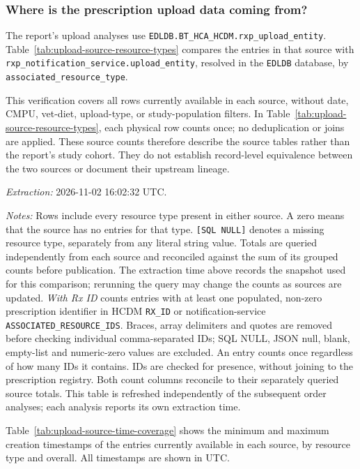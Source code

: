 \subsubsection{Where is the prescription upload data coming from?}
\label{subsec:upload-data-sources}
The report's upload analyses use
\texttt{EDLDB.BT\_HCA\_HCDM.rxp\_upload\_entity}.
Table~\ref{tab:upload-source-resource-types} compares the entries in that
source with \texttt{rxp\_notification\_service.upload\_entity}, resolved in
the \texttt{EDLDB} database, by \texttt{associated\_resource\_type}.

This verification covers all rows currently available in each source,
without date, CMPU, vet-diet, upload-type, or study-population filters.
In Table~\ref{tab:upload-source-resource-types}, each physical row counts
once; no deduplication or joins are applied.
These source counts therefore describe the source tables rather than the report's
study cohort. They do not establish record-level equivalence between the
two sources or document their upstream lineage.



\noindent\textit{Extraction:} 2026-11-02 16:02:32 UTC.


\noindent\textit{Notes:} Rows include every resource type present in either
source. A zero means that the source has no entries for that type.
\texttt{[SQL NULL]} denotes a missing resource type, separately from any
literal string value. Totals are queried independently from each source
and reconciled against the sum of its grouped counts before publication.
The extraction time above records the snapshot used for this comparison;
rerunning the query may change the counts as sources are updated.
\textit{With Rx ID} counts entries with at least one populated, non-zero
prescription identifier in HCDM \texttt{RX\_ID} or notification-service
\texttt{ASSOCIATED\_RESOURCE\_IDS}. Braces, array delimiters and quotes are
removed before checking individual comma-separated IDs; SQL NULL, JSON null,
blank, empty-list and numeric-zero values are excluded. An entry counts once
regardless of how many IDs it contains. IDs are checked for presence, without
joining to the prescription registry. Both count columns reconcile to their
separately queried source totals.
This table is refreshed independently of the subsequent order analyses;
each analysis reports its own extraction time.


Table~\ref{tab:upload-source-time-coverage} shows the minimum and maximum creation timestamps of the entries currently available in each source, by resource type and overall. All timestamps are shown in UTC.


